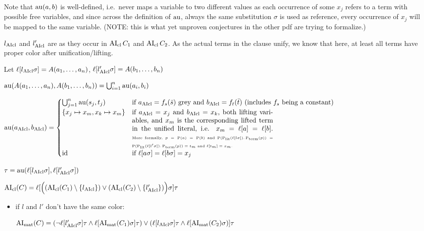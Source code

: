 \documentclass[,%
	paper=a4,%
	DIV14, %
	twoside=false,%
	liststotoc,
	bibtotoc,
	draft=false,%
	numbers=noendperiod
]{scrartcl}
\begin{document}
\begin{enumerate}
		Note that $\operatorname{au}(a, b)$ is well-defined, i.e.~never maps a variable to two different values as each occurrence of some $x_j$ refers to a term with possible free variables, and since across the definition of $\operatorname{au}$, always the same substitution $\sigma$ is used as reference, every occurrence of $x_j$ will be mapped to the same variable. (NOTE: this is what yet unproven conjectures in the other pdf are trying to formalize.)


		$l_{\operatorname{AIcl}}$ and $l'_{\operatorname{AIcl}}$ are as they occur in $\operatorname{AI}_\mathrm{cl}{C_1}$ and $\operatorname{AI}_\mathrm{cl}{C_2}$. As the actual terms in the clause unify, we know that here, at least all terms have proper color after unification/lifting.

		Let 
		$\ell[l_{\operatorname{AIcl}}\sigma] = A(a_1, \dotsc, a_n)$, $\ell[l_{\operatorname{AIcl}}'\sigma] = A(b_1, \dotsc, b_n)$

		$\operatorname{au}(A(a_1, \dotsc, a_n), A(b_1, \dotsc, b_n)) = \bigcup_{i=1}^n \operatorname{au}(a_i, b_i)$

		$ \aiu (a\fromclause, b\fromclause) =
		\begin{cases}
			\bigcup_{j=1}^n \aiu(s_j, t_j) & \text{if $a\cl=f_s(\bar s)$ grey and $b\cl = f_t(\bar t)$ (includes $f_s$ being a constant)} \\
			\{x_j \mapsto x_m, x_k \mapsto x_m\} & \parbox[t]{.6\textwidth}{if $a\cl = x_j$ and $b\cl = x_k$, both lifting variables, and $x_m$ is the corresponding lifted term in the unified literal, i.e. $x_m = \lifboth{a} = \lifboth{b}$.
			{\tiny

				More formally, $p = \pos(a) = \pos(b)$ and $\pos(\poslit(\lifboth{l\sigma}).\posterm(p)) = \pos(\poslit(\lifboth{l'\sigma}).\posterm(p)) = t_m$ and $\lifboth{t_m} = x_m$.

		}}\\
				\id & \text{if $\lifboth{a\sigma} = \lifboth{b\sigma} = x_j$ }
			\end{cases} $

			$\tau = \operatorname{au}(\ell[l_{\operatorname{AIcl}}\sigma], \ell[l'_{\operatorname{AIcl}}\sigma])$


		$\operatorname{AI}_\mathrm{cl}(C) =
		\ell[\Big( (\operatorname{AI}_\mathrm{cl}(C_1) \setminus \{l_{\operatorname{AIcl}}\}) \lor (\operatorname{AI}_\mathrm{cl}(C_2)\setminus \{l_{\operatorname{AIcl}}'\}) \Big)\sigma] \tau$ 

		

		\begin{itemize}
			\item if $l$ and $l'$ don't have the same color:

				$\operatorname{AI}_\mathrm{mat}(C) =
				(\lnot {\ell[l'\ensuremath{_{\operatorname{AIcl}}}\sigma]\tau} \land \ell[\operatorname{AI}_\mathrm{mat}(C_1)\sigma]\tau) \lor
				(\ell[l_{\operatorname{AIcl}}\sigma]\tau \land \ell[\operatorname{AI}_\mathrm{mat}(C_2)\sigma) ]\tau
				$



\end{itemize}
\end{enumerate}
\end{document}
